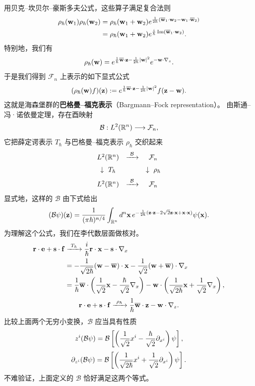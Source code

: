用贝克–坎贝尔–豪斯多夫公式，这些算子满足复合法则
\[
\begin{aligned}
\rho_\hbar(\mathbf w_1)\rho_\hbar(\mathbf w_2)
&=\rho_\hbar(\mathbf w_1+\mathbf w_2)
e^{\frac{1}{2\hbar}(\overline{\mathbf w}_1\cdot\mathbf w_2-\mathbf w_1\cdot\overline{\mathbf w}_2)}\\
&=\rho_\hbar(\mathbf w_1+\mathbf w_2)
e^{\frac{i}{\hbar}\operatorname{Im}(\overline{\mathbf w}_1\cdot\mathbf w_2)}.
\end{aligned}
\]
特别地，我们有
\[
\rho_\hbar(\mathbf w)
=e^{\frac{1}{\hbar}\overline{\mathbf w}\cdot\mathbf z-\frac{1}{2\hbar}\lvert \mathbf w\rvert^2}
e^{-\mathbf w\cdot\nabla_z}.
\]
于是我们得到 $\mathcal{F}_n$ 上表示的如下显式公式
\[
(\rho_\hbar(\mathbf w)f)(\mathbf z)
:=e^{\frac{1}{\hbar}\overline{\mathbf w}\cdot\mathbf z-\frac{1}{2\hbar}\lvert \mathbf w\rvert^2}
f(\mathbf z-\mathbf w).
\]
这就是海森堡群的\textbf{巴格曼–福克表示}（Bargmann–Fock representation）。
由斯通–冯·诺依曼定理，存在酉映射
\[
\mathcal{B}:L^2(\mathbb{R}^n)\longrightarrow\mathcal{F}_n,
\]
它把薛定谔表示 $T_\hbar$ 与巴格曼–福克表示 $\rho_\hbar$ 交织起来
\[
\begin{array}{ccc}
L^2(\mathbb{R}^n) & \xrightarrow{\ \mathcal{B}\ } & \mathcal{F}_n\\[6pt]
\downarrow\ T_\hbar & & \downarrow\ \rho_\hbar\\[6pt]
L^2(\mathbb{R}^n) & \xrightarrow{\ \mathcal{B}\ } & \mathcal{F}_n
\end{array}
\]
显式地，这样的 $\mathcal{B}$ 由下式给出
\[
(\mathcal{B}\psi)(\mathbf z)
=\frac{1}{(\pi\hbar)^{n/4}}\int_{\mathbb{R}^n}d^n\mathbf x\,
e^{-\frac{1}{2\hbar}(\mathbf z\cdot\mathbf z-2\sqrt2\mathbf z\cdot\mathbf x+\mathbf x\cdot\mathbf x)}
\psi(\mathbf x).
\]
为理解这个公式，我们在李代数层面做核对。
\[
\begin{aligned}
\mathbf r\cdot\mathbf e+\mathbf s\cdot\mathbf f
&\xrightarrow{\ T_\hbar\ }\frac{i}{\hbar}\mathbf r\cdot\mathbf x-\mathbf s\cdot\nabla_x\\
&=-\frac{1}{\sqrt{2\hbar}}(\mathbf w-\overline{\mathbf w})\cdot\mathbf x
-\frac{1}{\sqrt2}(\mathbf w+\overline{\mathbf w})\cdot\nabla_x\\
&=\frac{1}{\hbar}\overline{\mathbf w}\cdot\left(\frac{1}{\sqrt2}\mathbf x
-\frac{\hbar}{\sqrt2}\nabla_x\right)
-\mathbf w\cdot\left(\frac{1}{\sqrt{2\hbar}}\mathbf x
+\frac{1}{\sqrt2}\nabla_x\right),
\end{aligned}
\]
\[
\mathbf r\cdot\mathbf e+\mathbf s\cdot\mathbf f
\xrightarrow{\ \rho_\hbar\ }
\frac{1}{\hbar}\overline{\mathbf w}\cdot\mathbf z-\mathbf w\cdot\nabla_z.
\]
比较上面两个无穷小变换，$\mathcal{B}$ 应当具有性质
\[
z^i(\mathcal{B}\psi)
=\mathcal{B}\left[\left(\frac{1}{\sqrt2}x^i
-\frac{\hbar}{\sqrt2}\partial_{x^i}\right)\psi\right],
\]
\[
\partial_{z^i}(\mathcal{B}\psi)
=\mathcal{B}\left[\left(\frac{1}{\sqrt{2\hbar}}x^i
+\frac{1}{\sqrt2}\partial_{x^i}\right)\psi\right].
\]
不难验证，上面定义的 $\mathcal{B}$ 恰好满足这两个等式。

